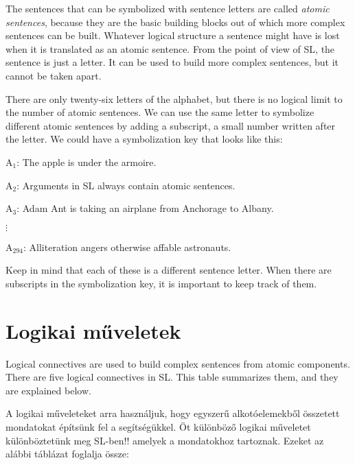 The sentences that can be symbolized with sentence letters are called \emph{atomic sentences}, because they are the basic building blocks out of which more complex sentences can be built. Whatever logical structure a sentence might have is lost when it is translated as an atomic sentence. From the point of view of SL, the sentence is just a letter. It can be used to build more complex sentences, but it cannot be taken apart.



There are only twenty-six letters of the alphabet, but there is no logical limit to the number of atomic sentences. We can use the same letter to symbolize different atomic sentences by adding a subscript, a small number written after the letter. We could have a symbolization key that looks like this:
\begin{ekey}
\item[A$_1$:] The apple is under the armoire.
\item[A$_2$:] Arguments in SL always contain atomic sentences.
\item[A$_3$:] Adam Ant is taking an airplane from Anchorage to Albany.
\item[$\vdots$]
\item[A$_{294}$:] Alliteration angers otherwise affable astronauts.
\end{ekey}
Keep in mind that each of these is a different sentence letter. When there are subscripts in the symbolization key, it is important to keep track of them.


\section{Logikai műveletek}
Logical connectives are used to build complex sentences from atomic components. There are five logical connectives in SL. This table summarizes them, and they are explained below.


A logikai műveleteket arra használjuk, hogy egyszerű alkotóelemekből összetett mondatokat építsünk fel a segítségükkel. Öt különböző logikai műveletet különböztetünk meg SL-ben!! amelyek a mondatokhoz tartoznak. Ezeket az alábbi táblázat foglalja össze:

